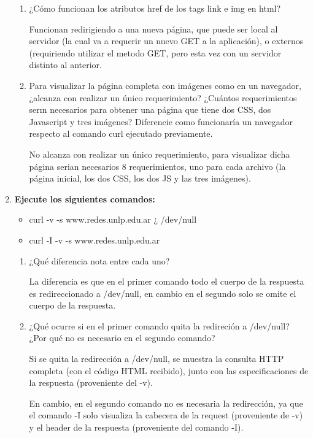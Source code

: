 \documentclass[a4paper,10pt]{article}
\begin{document}
\begin{enumerate}
\begin{enumerate}
            \item ¿Cómo funcionan los atributos href de los tags link e img en html?

            Funcionan redirigiendo a una nueva página, que puede ser local al servidor (la cual va a requerir un nuevo GET a la aplicación), o externos (requiriendo utilizar el metodo GET, pero esta vez con un servidor distinto al anterior.

            \item Para visualizar la página completa con imágenes como en un navegador, ¿alcanza con realizar un único requerimiento? ¿Cuántos requerimientos serın necesarios para obtener una página que tiene dos CSS, dos Javascript y tres imágenes? Diferencie como funcionaría un navegador respecto al comando curl ejecutado previamente.

            No alcanza con realizar un único requerimiento, para visualizar dicha página serian necesarios 8 requerimientos, uno para cada archivo (la página inicial, los dos CSS, los dos JS y las tres imágenes).

        \end{enumerate}

    \item \textbf{Ejecute los siguientes comandos:}
        \begin{itemize}
            \item curl -v -s www.redes.unlp.edu.ar ¿ /dev/null
            \item curl -I -v -s www.redes.unlp.edu.ar
        \end{itemize}

        \begin{enumerate}
            \item ¿Qué diferencia nota entre cada uno?

            La diferencia es que en el primer comando todo el cuerpo de la respuesta es redireccionado a /dev/null, en cambio en el segundo solo se omite el cuerpo de la respuesta.

            \item ¿Qué ocurre si en el primer comando quita la redireción a /dev/null? ¿Por qué no es necesario en el segundo comando?

            Si se quita la redirección a /dev/null, se muestra la consulta HTTP completa (con el código HTML recibido), junto con las especificaciones de la respuesta (proveniente del -v).

            En cambio, en el segundo comando no es necesaria la redirección, ya que el comando -I solo visualiza la cabecera de la request (proveniente de -v) y el header de la respuesta (proveniente del comando -I).


\end{enumerate}
\end{enumerate}
\end{document}
